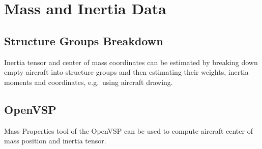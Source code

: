 \chapter{Mass and Inertia Data}

\section{Structure Groups Breakdown}

Inertia tensor and center of mass coordinates can be estimated by breaking down empty aircraft into structure groups and then estimating their weights, inertia moments and coordinates, e.g. using aircraft drawing. \cite{Torenbeek1982}

\section{OpenVSP}

Mass Properties tool of the OpenVSP can be used to compute aircraft center of mass position and inertia tensor.
